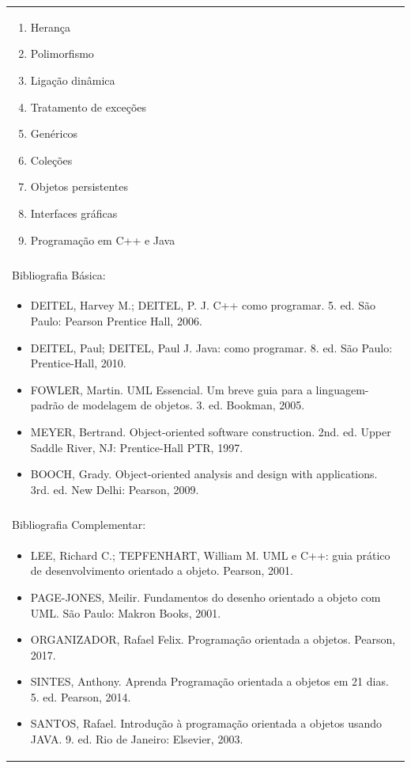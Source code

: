 \documentclass[11pt]{article}
\begin{document}
\begin{center}
\begin{longtable}{|p{4cm}|p{4cm}|p{4cm}|p{4cm}|}
{\begin{enumerate}
\item Herança
\item Polimorfismo
\item Ligação dinâmica
\item Tratamento de exceções
\item Genéricos
\item Coleções
\item Objetos persistentes
\item Interfaces gráficas
\item Programação em C++ e Java\end{enumerate}}\\
\multicolumn{4}{|p{16cm}|}{}\\
\hline
\multicolumn{4}{|p{16cm}|}{Bibliografia Básica:}\\
\multicolumn{4}{|p{16cm}|}{%
\begin{itemize}\item DEITEL, Harvey M.; DEITEL, P. J. C++ como programar. 5. ed. São Paulo: Pearson Prentice Hall, 2006.
\item DEITEL, Paul; DEITEL, Paul J. Java: como programar. 8. ed. São Paulo: Prentice-Hall, 2010.
\item FOWLER, Martin. UML Essencial. Um breve guia para a linguagem-padrão de modelagem de objetos. 3. ed. Bookman, 2005.
\item MEYER, Bertrand. Object-oriented software construction. 2nd. ed. Upper Saddle River, NJ: Prentice-Hall PTR, 1997.
\item BOOCH, Grady. Object-oriented analysis and design with applications. 3rd. ed. New Delhi: Pearson, 2009.\end{itemize}}\\
\multicolumn{4}{|p{16cm}|}{}\\
\hline
\multicolumn{4}{|p{16cm}|}{Bibliografia Complementar:}\\
\multicolumn{4}{|p{16cm}|}{%
\begin{itemize}\item LEE, Richard C.; TEPFENHART, William M. UML e C++: guia prático de desenvolvimento orientado a objeto. Pearson, 2001.
\item PAGE-JONES, Meilir. Fundamentos do desenho orientado a objeto com UML. São Paulo: Makron Books, 2001.
\item ORGANIZADOR, Rafael Felix. Programação orientada a objetos. Pearson, 2017.
\item SINTES, Anthony. Aprenda Programação orientada a objetos em 21 dias. 5. ed. Pearson, 2014.
\item SANTOS, Rafael. Introdução à programação orientada a objetos usando JAVA. 9. ed. Rio de Janeiro: Elsevier, 2003.

\end{itemize}}
\end{longtable}
\end{center}
\end{document}
